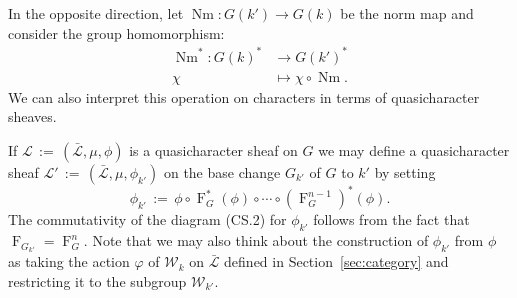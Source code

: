 \documentclass[11pt]{amsart}
\theoremstyle{plain}
\theoremstyle{definition}
\theoremstyle{remark}
\newcommand{\Frob}[1]{\operatorname{F}_{#1}}
\DeclareMathOperator{\Nm}{Nm}
\newcommand{\ceq}{{\, :=\, }}
\newcommand{\qcs}[1]{{\mathcal{#1}}}
\newcommand{\gqcs}[1]{{\mathcal{\bar #1}}}
\newcommand{\Weil}[1]{\mathcal{W}_{#1}}
\begin{document}
In the opposite direction, let $\Nm : G(k') \to G(k)$ be the norm map and consider the group homomorphism:
\begin{align*}
\Nm^* : G(k)^* &\to G(k')^* \\
\chi &\mapsto \chi\circ \Nm.
\end{align*}
We can also interpret this operation on characters in terms of quasicharacter sheaves.

If $\qcs{L} \ceq (\gqcs{L}, \mu, \phi)$ is a quasicharacter sheaf on $G$ we may define
a quasicharacter sheaf $\qcs{L}' \ceq (\gqcs{L}, \mu, \phi_{k'})$ on the base change
$G_{k'}$ of $G$ to $k'$ by setting
\[
\phi_{k'} \ceq \phi \circ \Frob{G}^*(\phi) \circ \cdots \circ (\Frob{G}^{n-1})^*(\phi).
\]
The commutativity of the diagram (CS.2) for $\phi_{k'}$ 
follows from the fact that $\Frob{G_{k'}} = \Frob{G}^n$.
Note that we may also think about the construction of $\phi_{k'}$ from $\phi$
as taking the action $\varphi$ of $\Weil{k}$ on $\gqcs{L}$ 
defined in Section~\ref{sec:category} and restricting it to the subgroup $\Weil{k'}$.
\end{document}
